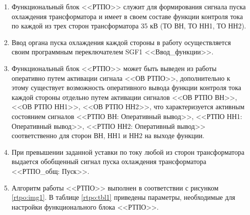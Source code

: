 \documentclass[a4paper, 12pt,table, hidelinks, DIV=calc]{extarticle} %
\begin{document}
\FloatBarrier %

\color{black}

\begin{enumerate}[label=\arabic{section}.\arabic{subsection}.\arabic*, labelsep=4pt, leftmargin=0pt, itemindent=57pt]

\item
Функциональный блок <<РТПО>> служит для формирования сигнала пуска охлаждения трансформатора и имеет в своем составе функции контроля тока по каждой из трех сторон трансформатора 35 кВ (ТО ВН, ТО НН1, ТО НН2). 

\item
Ввод органа пуска охлаждения каждой стороны в работу осуществляется своим программным переключателем SGF1 <<Ввод\_функции>>.
\item
Функциональный блок <<РТПО>> может быть выведен из работы оперативно путем активации сигнала <<ОВ РТПО>>, дополнительно к этому существует возможность оперативного вывода функции контроля тока каждой стороны отдельно путем активации сигналов <<ОВ РТПО ВН>>, <<ОВ РТПО НН1>>, <<ОВ РТПО НН2>>, что характеризуется активным состоянием сигналов <<РТПО ВН: Оперативный вывод>>, <<РТПО НН1: Оперативный вывод>>, <<РТПО НН2: Оперативный вывод>> соответственно для сторон ВН, НН1 и НН2 на выходе функции. 
\item
При превышении заданной уставки по току любой из сторон трансформатора выдается обобщенный сигнал пуска охлаждения трансформатора <<РТПО\_общ: Пуск>>.

\item
Алгоритм работы <<РТПО>> выполнен в соответствии с рисунком \ref{rtpo:img1}. В таблице \ref{rtpo:tbl1} приведены параметры, необходимые для настройки функционального блока <<РТПО>>.


\end{enumerate}
\end{document}
